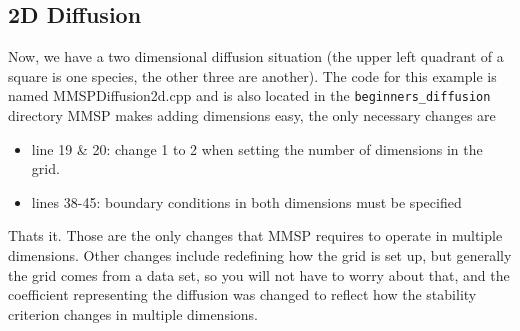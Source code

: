 \documentclass[10pt]{article}
\begin{document}
\subsection{2D Diffusion}
Now, we have a two dimensional diffusion situation (the upper left quadrant of a square is one species, the other three are another). The code for this example is named MMSPDiffusion2d.cpp and is also located in the {\tt beginners\_diffusion} directory MMSP makes adding dimensions easy, the only necessary changes are
\begin{itemize} \itemsep1pt \parskip0pt 
\item line 19 \& 20: change 1 to 2 when setting the number of dimensions in the grid. 
\item lines 38-45: boundary conditions in both dimensions must be specified
\end{itemize}
Thats it.  Those are the only changes that MMSP requires to operate in multiple dimensions.  Other changes include redefining how the grid is set up, but generally the grid comes from a data set, so you will not have to worry about that, and the coefficient representing the diffusion was changed to reflect how the stability criterion changes in multiple dimensions.
\end{document}
